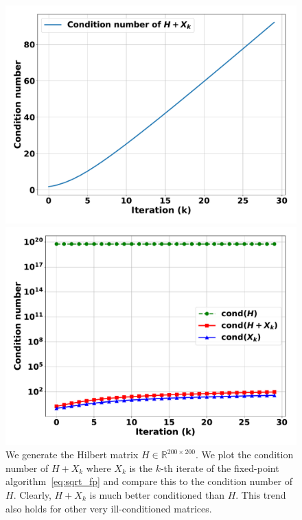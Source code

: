 \documentclass[sn-nature]{sn-jnl}%
\theoremstyle{thmstyleone}%
\theoremstyle{thmstyletwo}%
\theoremstyle{thmstylethree}%
\begin{document}
\begin{figure}[ht]
  \centering
  \begin{minipage}[b]{0.45\textwidth}
    \centering
    \includegraphics[width=\textwidth]{figures/A_rankK.pdf}
  \end{minipage}
  \hfill
  \begin{minipage}[b]{0.45\textwidth}
    \centering
    \includegraphics[width=\textwidth]{figures/A_X_rankK.pdf}
  \end{minipage}
  \caption{We generate the Hilbert matrix $H \in \mathbb{R}^{200 \times 200}$. We plot the condition number of $H+X_k$ where $X_k$ is the $k$-th iterate of the fixed-point algorithm~\ref{eq:sqrt_fp} and compare this to the condition number of $H$. Clearly, $H+X_k$ is much better conditioned than $H$. This trend also holds for other very ill-conditioned matrices.}
  \label{fig:cond_num_sqrt}
\end{figure}
\end{document}
